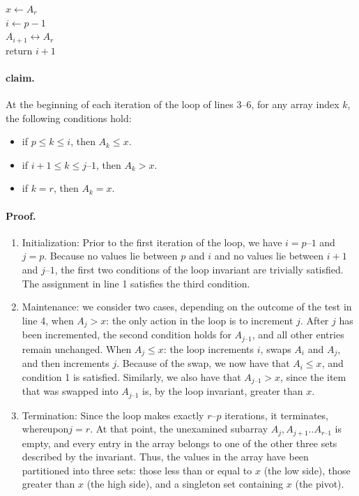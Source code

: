 

  \begin{algorithm}[H]
    $ x \leftarrow A_{r} $ \\
    $ i \leftarrow p - 1 $ \\
   $ A_{i+1} \leftrightarrow A_{r} $\\
   return $ i+1$
  \end{algorithm}


\paragraph{claim.} At the beginning of each iteration of the loop of lines 3–6, for any array index $k$, the following conditions hold:
\begin{itemize}
  \item  if $p \le k \le i$, then $A_{k} \le x$.
  \item  if $i + 1 \le k \le j – 1$, then $A_{k} > x$.
  \item  if $k = r$, then $A_{k} = x$.
\end{itemize}
\paragraph{Proof.}
\begin{enumerate}
  \item Initialization: Prior to the first iteration of the loop, we have $i = p – 1$ and $ j= p$. Because no values lie between $p$ and $i$ and no values lie between $i + 1$ and $j – 1$, the first two conditions of the loop invariant are trivially satisfied. The assignment in line 1 satisfies the third condition.
  \item Maintenance: we consider two cases, depending on the outcome of the test in line 4, when $A_{j} > x$: the only action in the loop is to increment $j$. After $j$  has been incremented, the second condition holds for $A_{j – 1}$, and all other entries remain unchanged. When $A_{j} \le x$: the loop increments $i$, swaps $A_{i}$ and $A_{j}$, and then increments $j$. Because of the swap, we now have that $A_{i} \le x$, and condition 1 is satisfied. Similarly, we also have that $A_{j – 1} > x$, since the item that was swapped into $A_{j – 1}$ is, by the loop invariant, greater than $x$.
  \item Termination: Since the loop makes exactly $r – p$ iterations, it terminates, whereupon$ j= r$. At that point, the unexamined subarray $A_{j}, A_{j+1}..  A_{r – 1}$ is empty, and every entry in the array belongs to one of the other three sets described by the invariant. Thus, the values in the array have been partitioned into three sets: those less than or equal to $x$ (the low side), those greater than $x$ (the high side), and a singleton set containing $x$ (the pivot).


\end{enumerate}


